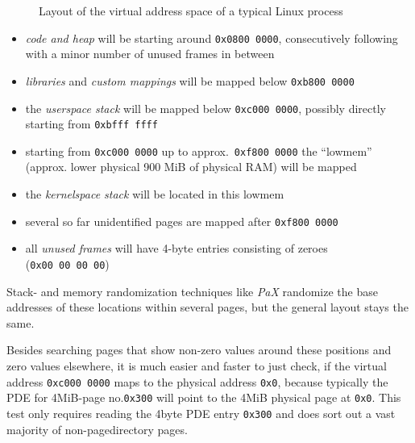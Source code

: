 \begin{figure}[ht] \begin{center}

	\epsfysize 8.5cm


	\caption{Layout of the virtual address space of a typical Linux process}

	\label{fig:linux_virtual_address_space}

\end{center}\end{figure}


\begin{itemize}

	\item \emph{code and heap} will be starting around \texttt{0x0800~0000},
	consecutively following with a minor number of unused frames in between

	\item \emph{libraries} and \emph{custom mappings} will be mapped below
	\texttt{0xb800~0000}

	\item the \emph{userspace stack} will be mapped below \texttt{0xc000~0000},
	possibly directly starting from \texttt{0xbfff~ffff}

	\item starting from \texttt{0xc000~0000} up to approx.~\texttt{0xf800~0000}
	the ``lowmem'' (approx. lower physical 900 MiB of physical RAM) will be mapped

	\item the \emph{kernelspace stack} will be located in this lowmem

	\item several so far unidentified pages are mapped after
	\texttt{0xf800~0000}

	\item all \emph{unused frames} will have 4-byte entries consisting of
	zeroes (\texttt{0x00~00~00~00})

\end{itemize}

Stack- and memory randomization techniques like \emph{PaX} randomize the base
addresses of these locations within several pages, but the general layout stays
the same.

Besides searching pages that show non-zero values around these positions and
zero values elsewhere, it is much easier and faster to just check, if the
virtual address \texttt{0xc000~0000} maps to the physical address \texttt{0x0},
because typically the PDE for 4MiB-page no.\@ \texttt{0x300} will point to the
4MiB physical page at \texttt{0x0}. This test only requires reading the 4byte
PDE entry \texttt{0x300} and does sort out a vast majority of non-pagedirectory
pages.


